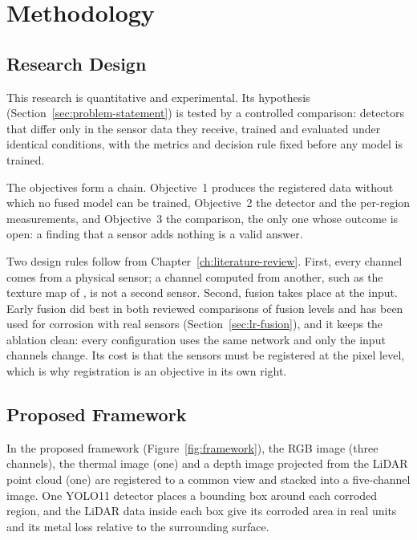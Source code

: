 \chapter[METHODOLOGY]{Methodology}
\label{ch:methodology}

\section{Research Design}
\label{sec:research-design}

This research is quantitative and experimental. Its hypothesis
(Section~\ref{sec:problem-statement}) is tested by a controlled comparison:
detectors that differ only in the sensor data they receive, trained and evaluated
under identical conditions, with the metrics and decision rule fixed before any
model is trained.

The objectives form a chain. Objective~1 produces the registered data without
which no fused model can be trained, Objective~2 the detector and the per-region
measurements, and Objective~3 the comparison, the only one whose outcome is open:
a finding that a sensor adds nothing is a valid answer.

Two design rules follow from Chapter~\ref{ch:literature-review}. First, every
channel comes from a physical sensor; a channel computed from another, such as the
texture map of \citet{Mao2026}, is not a second sensor. Second, fusion takes place
at the input. Early fusion did best in both reviewed comparisons of fusion levels
and has been used for corrosion with real sensors (Section~\ref{sec:lr-fusion}),
and it keeps the ablation clean: every configuration uses the same network and
only the input channels change. Its cost is that the sensors must be registered
at the pixel level, which is why registration is an objective in its own right.

\section{Proposed Framework}
\label{sec:framework}

In the proposed framework (Figure~\ref{fig:framework}), the RGB image (three
channels), the thermal image (one) and a depth image projected from the LiDAR
point cloud (one) are registered to a common view and stacked into a five-channel
image. One YOLO11 detector \citep{Ultralytics2023} places a bounding box around
each corroded region, and the LiDAR data inside each box give its corroded area
in real units and its metal loss relative to the surrounding surface.

